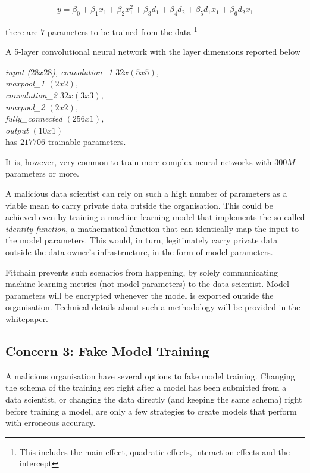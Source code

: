 \documentclass[12pt, a4paper,titlepage]{extreport}
\begin{document}
 \begin{equation}\label{linregr}
 y=\beta_0+\beta_1 x_1 + \beta_2 x_1^2 + \beta_3 d_1 + \beta_4 d_2 + \beta_5 d_1 x_1+ \beta_6 d_2 x_1  
 \end{equation}
 
there are $7$ parameters to be trained from the data \footnote{This includes the main effect, quadratic effects, interaction effects and the intercept}
 
A 5-layer convolutional neural network \cite{CNN} with the layer dimensions reported below

\textit{
input ($28x28$), convolution\_1 $32x(5x5)$, \\
maxpool\_1 $(2x2)$, \\
convolution\_2 $32x(3x3)$, \\
maxpool\_2 $(2x2)$, \\
fully\_connected $(256x1)$, \\ 
output $(10x1)$ } \\

has $217706$ trainable parameters. 

It is, however, very common to train more complex neural networks with $300M$ parameters or more. 

A malicious data scientist can rely on such a high number of parameters as a viable mean to carry private data outside the organisation. This could be achieved even by training a machine learning model that implements the so called \textit{identity function}, a mathematical function that can identically map the input to the model parameters. This would, in turn, legitimately carry private data outside the data owner's infrastructure, in the form of model parameters. 

Fitchain prevents such scenarios from happening, by solely communicating machine learning metrics (not model parameters) to the data scientist. Model parameters will be encrypted whenever the model is exported outside the organisation. Technical details about such a methodology will be provided in the whitepaper.

\subsection{Concern 3: Fake Model Training}
A malicious organisation have several options to fake model training. Changing the schema of the training set right after a model has been submitted from a data scientist, or changing the data directly (and keeping the same schema) right before training a model, are only a few strategies to create models that perform with erroneous accuracy.
\end{document}

